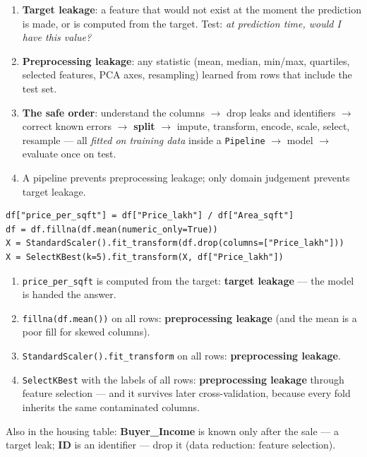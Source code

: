 \documentclass[11pt]{article}
\newcommand{\method}[1]{\begin{keyidea}[The method: #1]}
\begin{document}
\method{finding a leak}
\begin{enumerate}
  \item \textbf{Target leakage}: a feature that would not exist at the moment
    the prediction is made, or is computed from the target. Test: \emph{at
    prediction time, would I have this value?}
  \item \textbf{Preprocessing leakage}: any statistic (mean, median, min/max,
    quartiles, selected features, PCA axes, resampling) learned from rows
    that include the test set.
  \item \textbf{The safe order}: understand the columns $\to$ drop leaks and
    identifiers $\to$ correct known errors $\to$ \textbf{split} $\to$ impute,
    transform, encode, scale, select, resample --- all \emph{fitted on
    training data} inside a \texttt{Pipeline} $\to$ model $\to$ evaluate once
    on test.
  \item A pipeline prevents preprocessing leakage; only domain judgement
    prevents target leakage.
\end{enumerate}
\end{keyidea}

\begin{worked}
\begin{lstlisting}
df["price_per_sqft"] = df["Price_lakh"] / df["Area_sqft"]
df = df.fillna(df.mean(numeric_only=True))
X = StandardScaler().fit_transform(df.drop(columns=["Price_lakh"]))
X = SelectKBest(k=5).fit_transform(X, df["Price_lakh"])
\end{lstlisting}
\begin{enumerate}[label=(\roman*)]
  \item \texttt{price\_per\_sqft} is computed from the target: \textbf{target
    leakage} --- the model is handed the answer.
  \item \texttt{fillna(df.mean())} on all rows: \textbf{preprocessing
    leakage} (and the mean is a poor fill for skewed columns).
  \item \texttt{StandardScaler().fit\_transform} on all rows:
    \textbf{preprocessing leakage}.
  \item \texttt{SelectKBest} with the labels of all rows:
    \textbf{preprocessing leakage} through feature selection --- and it
    survives later cross-validation, because every fold inherits the same
    contaminated columns.
\end{enumerate}
Also in the housing table: \textbf{Buyer\_Income} is known only after the
sale --- a target leak; \textbf{ID} is an identifier --- drop it (data
reduction: feature selection).
\end{worked}
\end{document}
